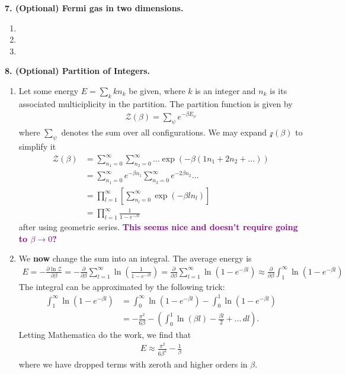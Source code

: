 \documentclass{article}
\theoremstyle{definition}
\newcommand{\p}{\partial}
\newcommand{\be}{\beta}
\newcommand{\f}[2]{\frac{#1}{#2}}
\newcommand{\lp}{\left(}
\newcommand{\rp}{\right)}
\newcommand{\lb}{\left[}
\newcommand{\rb}{\right]}
\begin{document}
\noindent \textbf{7. (Optional) Fermi gas in two dimensions.}

\begin{enumerate}[label=(\alph*)]
	\item 
	
	\item 
	
	\item 
	
\end{enumerate}


\noindent \textbf{8. (Optional) Partition of Integers.}

\begin{enumerate}[label=(\alph*)]
	\item Let some energy $E = \sum_k k n_k$ be given, where $k$ is an integer and $n_k$ is its associated multiciplicity in the partition. The partition function is given by 
	\begin{align*}
	\mathcal{Z}(\be) = \sum_{\psi } e^{-\be E_\psi}
	\end{align*}
	where $\sum_\psi$ denotes the sum over all configurations. We may expand $\mathcal{z}(\be)$ to simplify it
	\begin{align*}
	\mathcal{Z}(\be)
	&= \sum_{n_1=0}^\infty \sum_{n_2=0}^\infty \dots \exp\lp -\be (1 n_1 + 2  n_2 + \dots )\rp \\
	&= \sum_{n_1=0}^\infty e^{-\be n_1} \sum_{n_2= 0}^\infty e^{-2\be n_2 } \dots \\
	&= \prod_{l=1}^\infty \lb \sum_{n_l=0}^\infty \exp\lp -\be l n_l \rp \rb \\
	&= \prod_{l=1}^\infty \f{1}{1 - e^{-\be l}}
	\end{align*} 
	after using geometric series. \textbf{\textcolor{purple}{This seems nice and doesn't require going to $\be\to 0$? }}
	
	
	
	\item We \textbf{now} change the sum into an integral. The average energy is 
	\begin{align*}
	E = -\f{\p \ln \mathcal{Z}}{\p \be} = -\f{\p}{\p \be}\sum_{l=1}^\infty \ln \lp \f{1}{1 - e^{-\be l}}  \rp = \f{\p}{\p \be}\sum_{l=1}^\infty \ln \lp 1 - e^{-\be l} \rp \approx \f{\p}{\p \be}\int_1^\infty \ln \lp 1 - e^{-\be l} \rp 
	\end{align*}	
	The integral can be approximated by the following trick:
	\begin{align*}
	\int_1^\infty \ln \lp 1 - e^{-\be l} \rp 
	&= \int_0^\infty \ln \lp 1 - e^{-\be l} \rp - \int_0^1 \ln \lp 1 - e^{-\be l} \rp \\
	&= -\f{\pi^2}{6\be} - \lp \int_0^1 \ln(\be l) - \f{\be l}{2} + \dots \,dl \rp.
	\end{align*}
	Letting Mathematica do the work, we find that
	\begin{align*}
	\boxed{E \approx \f{\pi^2}{6\be^2} - \f{1}{\be}}
	\end{align*}
	where we have dropped terms with zeroth and higher orders in $\be$. 
	

\end{enumerate}
\end{document}
